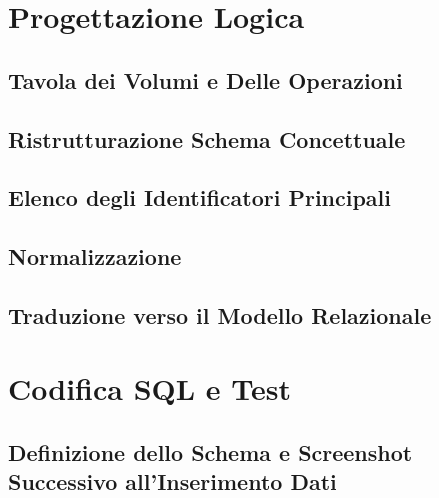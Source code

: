 \documentclass[12pt]{article} %
\begin{document}
		


	\section{Progettazione Logica}

		\subsection{Tavola dei Volumi e Delle Operazioni}

		
		\subsection{Ristrutturazione Schema Concettuale}

		
    \newpage
		\subsection{Elenco degli Identificatori Principali}

		
    \newpage
		\subsection{Normalizzazione}

		
		\subsection{Traduzione verso il Modello Relazionale}

		


	\section{Codifica SQL e Test}

		\subsection{Definizione dello Schema e Screenshot Successivo all'Inserimento Dati}
		

%
%
% 		
%
%
\end{document}
